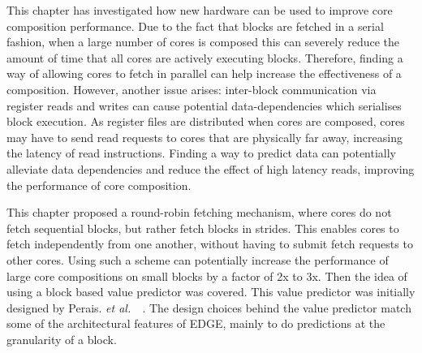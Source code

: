 This chapter has investigated how new hardware can be used to improve core composition performance.
Due to the fact that blocks are fetched in a serial fashion, when a large number of cores is composed this can severely reduce the amount of time that all cores are actively executing blocks.
Therefore, finding a way of allowing cores to fetch in parallel can help increase the effectiveness of a composition.
However, another issue arises: inter-block communication via register reads and writes can cause potential data-dependencies which serialises block execution.
As register files are distributed when cores are composed, cores may have to send read requests to cores that are physically far away, increasing the latency of read instructions.
Finding a way to predict data can potentially alleviate data dependencies and reduce the effect of high latency reads, improving the performance of core composition.

This chapter proposed a round-robin fetching mechanism, where cores do not fetch sequential blocks, but rather fetch blocks in strides.
This enables cores to fetch independently from one another, without having to submit fetch requests to other cores.
Using such a scheme can potentially increase the performance of large core compositions on small blocks by a factor of 2x to 3x.
Then the idea of using a block based value predictor was covered.
This value predictor was initially designed by Perais. {\it et al.~}~\cite{peraisVTAGE2014, peraisBeBop2015}.
The design choices behind the value predictor match some of the architectural features of EDGE, mainly to do predictions at the granularity of a block.


